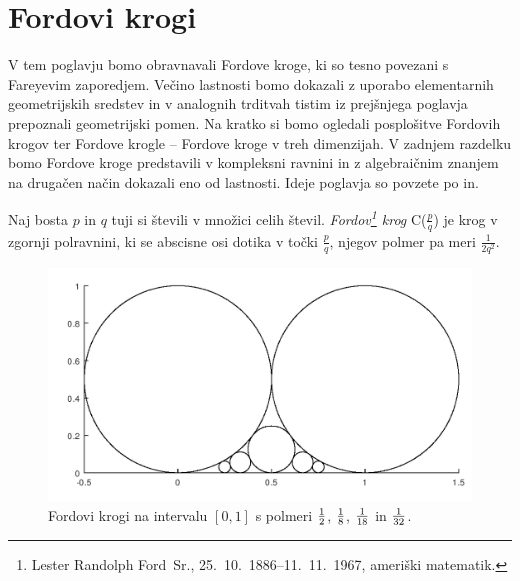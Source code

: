 \documentclass[mat1]{fmfdelo}
\begin{document}
%
\section{Fordovi krogi}

V tem poglavju bomo obravnavali Fordove kroge, ki so tesno povezani s Fareyevim zaporedjem. Večino lastnosti bomo dokazali z uporabo elementarnih geometrijskih sredstev in v analognih trditvah tistim iz prejšnjega poglavja prepoznali geometrijski pomen. Na kratko si bomo ogledali posplošitve Fordovih krogov ter Fordove krogle -- Fordove kroge v treh dimenzijah. V zadnjem razdelku bomo Fordove kroge predstavili v kompleksni ravnini in z algebraičnim znanjem na drugačen način dokazali eno od lastnosti.
Ideje poglavja so povzete po \cite[poglavje 4]{fareyproject} in\cite{ford}.

\begin{definicija}
Naj bosta $p$ in $q$ tuji si števili v množici celih števil.
\emph{Fordov\footnote{Lester Randolph Ford~Sr., 25.\ 10.\ 1886--11.\ 11.\ 1967, ameriški matematik.} krog} C($\frac{p}{q}$) je krog v zgornji polravnini, ki se abscisne osi dotika v točki $\frac{p}{q}$, njegov polmer pa meri $\frac{1}{2q^2}$. 
\end{definicija}

\begin{figure}[h!]
\begin{center}
\includegraphics[scale=0.6]{fordovi_krogi.png}
\caption{Fordovi krogi na intervalu $[0,1]$ s polmeri $\protect{\frac{1}{2}}$, $\protect{\frac{1}{8}}$, $\protect{\frac{1}{18}}$ in $\protect{\frac{1}{32}}$.}
\end{center}
\end{figure}
\end{document}
